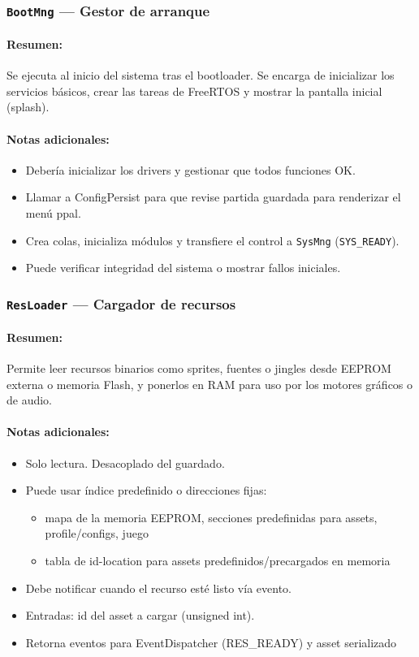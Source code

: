 \documentclass[11pt,a4paper]{article}
\begin{document}
\subsubsection{\texttt{BootMng} — Gestor de arranque}
\paragraph{Resumen:} Se ejecuta al inicio del sistema tras el bootloader. Se encarga de inicializar los servicios básicos, crear las tareas de FreeRTOS y mostrar la pantalla inicial (splash).
\paragraph{Notas adicionales:}
\begin{itemize}
  \item Debería inicializar los drivers y gestionar que todos funciones OK.
  \item Llamar a ConfigPersist para que revise partida guardada para renderizar el menú ppal.
  \item Crea colas, inicializa módulos y transfiere el control a \texttt{SysMng} (\texttt{SYS\_READY}).
  \item Puede verificar integridad del sistema o mostrar fallos iniciales.
\end{itemize}

\subsubsection{\texttt{ResLoader} — Cargador de recursos}
\paragraph{Resumen:} Permite leer recursos binarios como sprites, fuentes o jingles desde EEPROM externa o memoria Flash, y ponerlos en RAM para uso por los motores gráficos o de audio.
\paragraph{Notas adicionales:}
\begin{itemize}
  \item Solo lectura. Desacoplado del guardado.
  \item Puede usar índice predefinido o direcciones fijas:
  \begin{itemize}
    \item mapa de la memoria EEPROM, secciones predefinidas para assets, profile/configs, juego
    \item tabla de id-location para assets predefinidos/precargados en memoria
  \end{itemize}
  \item Debe notificar cuando el recurso esté listo vía evento.
  \item Entradas: id del asset a cargar (unsigned int).
  \item Retorna eventos para EventDispatcher (RES\_READY) y asset serializado
\end{itemize}
\end{document}
